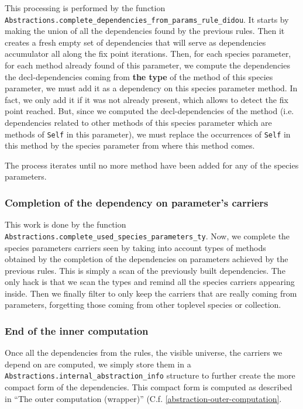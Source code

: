 This processing is performed by the function \\
{\tt Abstractions.complete\_dependencies\_from\_params\_rule\_didou}.
It starts by making the union of all the dependencies found by the
previous rules. Then it creates a fresh empty set of dependencies that
will serve as dependencies accumulator all along the fix point
iterations. Then, for each species parameter, for each method already
found of this parameter, we compute the dependencies the
decl-dependencies coming from {\bf the type} of the method of this
species parameter, we must add it as a dependency on this species
parameter method. In fact, we only add it if it was not already
present, which allows to detect the fix point reached. But, since we
computed the decl-dependencies of the method (i.e. dependencies
related to other methods of this species parameter which are methods
of {\tt Self} in this parameter), we must replace the occurrences of
{\tt Self} in this method by the species parameter from where this
method comes.

The process iterates until no more method have been added for any of
the species parameters.


\subsubsection{Completion of the dependency on parameter's carriers}
This work is done by the function
{\tt Abstractions.complete\_used\_species\_parameters\_ty}.
Now, we complete the species parameters carriers seen by taking into
account types of methods obtained by the completion of the
dependencies on parameters achieved by the previous rules. This is
simply a scan of the previously built dependencies. The only hack is
that we scan the types and remind all the species carriers appearing
inside. Then we finally filter to only keep the carriers that are
really coming from parameters, forgetting those coming from other
toplevel species or collection.


\subsubsection{End of the inner computation}

Once all the dependencies from the rules, the visible universe, the
carriers we depend on are computed, we simply store them in a
{\tt Abstractions.internal\_abstraction\_info} structure to further
create the more compact form of the dependencies. This compact form is
computed as described in ``The outer computation (wrapper)'' (C.f.
\ref{abstraction-outer-computation}.




